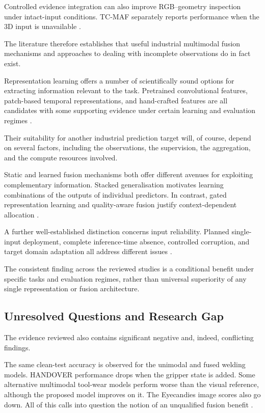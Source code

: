 Controlled evidence integration can also improve RGB--geometry inspection under intact-input
conditions. TC-MAF separately reports performance when the 3D input is unavailable \parencite{P026}.

The literature therefore establishes that useful industrial multimodal fusion mechanisms and
approaches to dealing with incomplete observations do in fact exist.

Representation learning offers a number of scientifically sound options for extracting information
relevant to the task. Pretrained convolutional features, patch-based temporal representations, and
hand-crafted features are all candidates with some supporting evidence under certain learning and
evaluation regimes \parencite{Roth2022Towards,Nie2023PatchTST,Horwitz2023Back}.

Their suitability for another industrial prediction target will, of course, depend on several
factors, including the observations, the supervision, the aggregation, and the compute resources
involved.

Static and learned fusion mechanisms both offer different avenues for exploiting complementary
information. Stacked generalisation motivates learning combinations of the outputs of individual
predictors. In contrast, gated representation learning and quality-aware fusion justify
context-dependent allocation \parencite{Ting1999Issues,P006,Zhang2023QMF}.

A further well-established distinction concerns input reliability. Planned single-input deployment,
complete inference-time absence, controlled corruption, and target domain adaptation all address
different issues \parencite{Li2025PGMTKD,Altinses2023Fuzzy,P051}.

The consistent finding across the reviewed studies is a conditional benefit under specific tasks and
evaluation regimes, rather than universal superiority of any single representation or fusion
architecture.

\subsection{Unresolved Questions and Research Gap}

The evidence reviewed also contains significant negative and, indeed, conflicting findings.

The same clean-test accuracy is observed for the unimodal and fused welding models. HANDOVER
performance drops when the gripper state is added. Some alternative multimodal tool-wear models
perform worse than the visual reference, although the proposed model improves on it. The Eyecandies
image scores also go down. All of this calls into question the notion of an unqualified fusion
benefit \parencite{Hua2026Weld,Thoduka2024Handover,P045,P033}.

